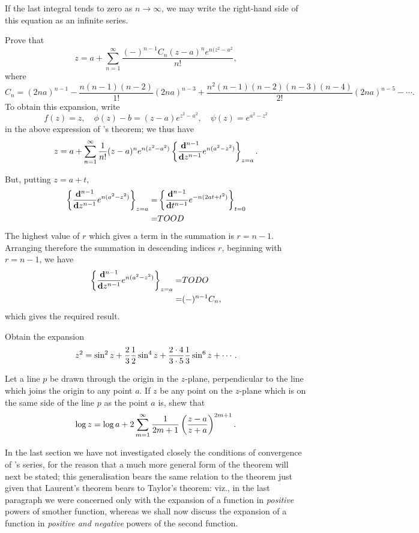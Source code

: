 If the last integral tends to zero as $n \rightarrow \infty$, we may write the
right-hand side of this equation as an infinite series.
\begin{wandwexample}
Prove that
$$
z 
=
a
+ \sum_{n=1}^{\infty}
\frac{(-)^{n-1} C_{n} (z-a)^{n} e^{n (z^{2} - a^{2}}}{n!},
$$
where
$$
C_{n}
=
(2na)^{n-1}
- \frac{n(n-1)(n-2)}{1!} (2na)^{n-3}
+ \frac{n^{2}(n-1)(n-2)(n-3)(n-4)}{2!} (2na)^{n-5}
- \cdots.
$$
To obtain this expansion, write
$$
f(z) = z,
\quad
\phi(z) - b = (z-a) e^{z^{2} - a^{2}},
\quad
\psi(z) = e^{a^{2} - z^{2}}
$$
in the above expression
of \Burmann's theorem; we thus have
$$
z
=
a
+ \sum_{n=1}^{\infty}
\frac{1}{n!}
(z-a)^{n}
e^{n(z^{2} - a^{2})}
\left\{ 
  \frac{\mathbf{d}^{n-1}}{\mathbf{d} z^{n-1}}
  e^{n(a^{2} - z^{2})}
 \right\}_{z=a}.
$$

But, putting $z = a + t$,
\begin{align*}
  \left\{ 
    \frac{\mathbf{d}^{n-1}}{\mathbf{d} z^{n-1}}
    e^{n(a^{2} - z^{2})}
   \right\}_{z=a}
  =&
  \left\{ 
    \frac{\mathbf{d}^{n-1}}{\mathbf{d} t^{n-1}}
    e^{-n(2at + t^{2})}
   \right\}_{t=0}
  \\
  =&
  TOOD
\end{align*}
The highest value of $r$ which gives a term in the summation is
$r = n-1$.
Arranging therefore the summation in descending indices $r$,
beginning with $r = n-1$, we have
\begin{align*}
  \left\{ 
    \frac{\mathbf{d}^{n-1}}{\mathbf{d} z^{n-1}}
    e^{n(a^{2} - z^{2})}
   \right\}_{z=a}
  =&
  TODO
  \\
  =& (-)^{n-1} C_{n},
\end{align*}
which gives the required result.
\end{wandwexample}
\begin{wandwexample}
  Obtain the expansion
  $$
  z^{2}
  =
  \sin^{2} z
  + \frac{2}{3} \frac{1}{2} \sin^{4} z
  + \frac{2 \cdot 4}{3 \cdot 5} \frac{1}{3} \sin^{6} z
  + \cdots.
  $$
\end{wandwexample}
%
%
\begin{wandwexample}
Let a line $p$ be drawn through the origin in the $z$-plane,
perpendicular to the line which joins the origin to any point $a$. If
$z$ be any point on the $z$-plane which is on the same side of the line
$p$ as the point $a$ is, shew that
$$
\log z
=
\log a
+ 2 \sum_{m=1}^{\infty}
\frac{1}{2m+1} \left( \frac{z-a}{z+a} \right)^{2m+1}.
$$
\end{wandwexample}

In the last section we have not investigated closely the conditions of
convergence of \Burmann's series, for the reason that a much more
general form of the theorem will next be stated; this generalisation
bears the same relation to the theorem just given that Laurent's
theorem bears to Taylor's theorem: viz., in the last paragraph we
were concerned only with the expansion of a function in \emph{positive}
powers of smother function, whereas we shall now discuss the expansion
of a function in \emph{positive and negative} powers of the second
function.


